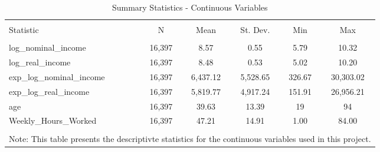 
\begin{table}[!htbp] \centering 
  \caption{Summary Statistics - Continuous Variables} 
  \label{} 
\begin{tabular}{@{\extracolsep{5pt}}lccccc} 
\\[-1.8ex]\hline 
\hline \\[-1.8ex] 
Statistic & \multicolumn{1}{c}{N} & \multicolumn{1}{c}{Mean} & \multicolumn{1}{c}{St. Dev.} & \multicolumn{1}{c}{Min} & \multicolumn{1}{c}{Max} \\ 
\hline \\[-1.8ex] 
log\_nominal\_income & 16,397 & 8.57 & 0.55 & 5.79 & 10.32 \\ 
log\_real\_income & 16,397 & 8.48 & 0.53 & 5.02 & 10.20 \\ 
exp\_log\_nominal\_income & 16,397 & 6,437.12 & 5,528.65 & 326.67 & 30,303.02 \\ 
exp\_log\_real\_income & 16,397 & 5,819.77 & 4,917.24 & 151.91 & 26,956.21 \\ 
age & 16,397 & 39.63 & 13.39 & 19 & 94 \\ 
Weekly\_Hours\_Worked & 16,397 & 47.21 & 14.91 & 1.00 & 84.00 \\ 
\hline \\[-1.8ex] 
\multicolumn{6}{l}{Note: This table presents the descriptivte statistics for the continuous variables used in this project.} \\ 
\end{tabular} 
\end{table} 
